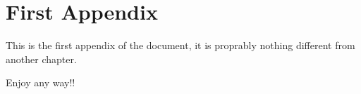 \chapter{First Appendix}
\label{chapter:appendix-i}

This is the first appendix of the document, it is proprably nothing different from another chapter.

Enjoy any way!!

